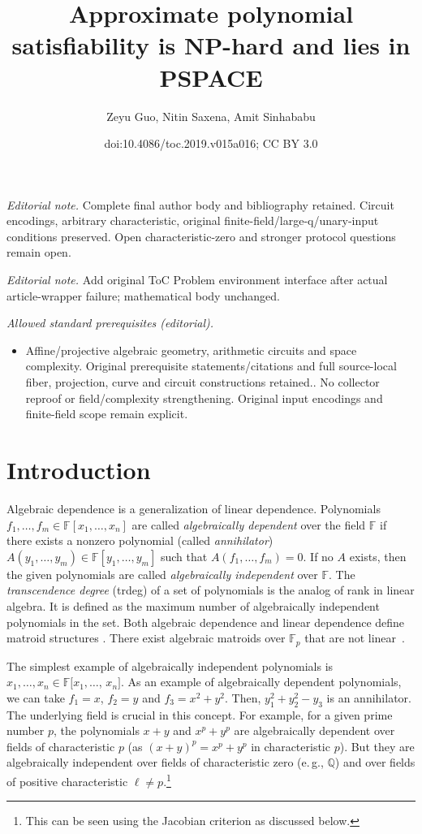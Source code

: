 \documentclass[11pt]{article}
\title{Approximate polynomial satisfiability is NP-hard and lies in PSPACE}
\author{Zeyu Guo, Nitin Saxena, Amit Sinhababu}
\date{doi:10.4086/toc.2019.v015a016; CC BY 3.0}
\numberwithin{equation}{section}
\theoremstyle{definition}
\theoremstyle{plain}
\newcommand{\eg}{e.\,g.}
\newcommand{\F}{\mathbb{F}}
\begin{document}
\maketitle
\noindent\textit{Editorial note.} Complete final author body and bibliography retained. Circuit encodings, arbitrary characteristic, original finite-field/large-q/unary-input conditions preserved. Open characteristic-zero and stronger protocol questions remain open.\par\medskip
\noindent\textit{Editorial note.} Add original ToC Problem environment interface after actual article-wrapper failure; mathematical body unchanged.\par\medskip
\noindent\textit{Allowed standard prerequisites (editorial).}\begin{itemize}
\item Affine/projective algebraic geometry, arithmetic circuits and space complexity. Original prerequisite statements/citations and full source-local fiber, projection, curve and circuit constructions retained.. No collector reproof or field/complexity strengthening. Original input encodings and finite-field scope remain explicit.
\end{itemize}\medskip
\section{Introduction}
%

Algebraic dependence is a generalization of linear dependence. Polynomials $f_1,\ldots ,f_m \in \F[x_1, \ldots ,x_n]$ are called \emph{algebraically dependent} over
the  %
field $\F$ if there exists a nonzero polynomial (called \emph{annihilator}) $A(y_1,\ldots ,y_m)\in \F[y_1,\ldots ,y_m]$ such that $A(f_1,\ldots,f_m)=0$. If no $A$ exists, then the given polynomials are called \emph{algebraically independent} over $\F$. The \emph{transcendence degree} (trdeg) of a set of polynomials is the analog of rank in linear algebra. It is defined as the
%
maximum   %
number of algebraically independent polynomials in the set. Both algebraic dependence and linear dependence
%
%
define matroid structures  %
\cite{ehrenborg1993apolarity}.
%
There exist algebraic matroids over $\F_p$ that are not
linear~\cite{ingleton1971representation}.   %

The simplest
%
example
of algebraically independent polynomials
%
is
$x_1,\ldots,x_n \in \F[x_1, \ldots$, $x_n] $. As an example of algebraically dependent polynomials, we can take $f_1=x$, $f_2=y$ and $f_3=x^2+y^2$. Then, $y_1^2 + y_2^2-y_3$ is an annihilator. The underlying field is crucial in this concept.
%
For example, for a given prime number $p$, the polynomials $x+y$ and $x^p + y^p$ are algebraically dependent over fields of characteristic $p$ (as $(x+y)^p=x^p+y^p$ in characteristic $p$).
But they are algebraically independent over fields of characteristic zero (\eg, $\mathbb{Q}$) %
and over fields of positive characteristic $\ell\neq p$.\footnote{This can be seen using the Jacobian criterion \cite{Jac41, BMS13} as discussed below.} %
\end{document}
